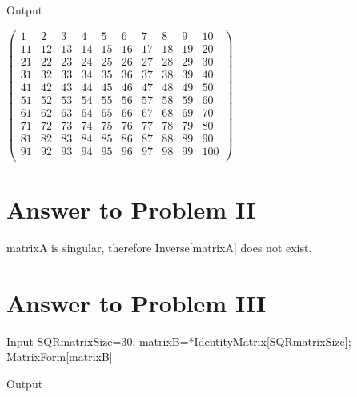 \documentclass[11pt,a4paper]{article}
\begin{document}
\begin{mmaCell}[form=MatrixForm]{Output}

\end{mmaCell}

\begin{doublespace}
\noindent\(\left(
\begin{array}{cccccccccc}
 1 & 2 & 3 & 4 & 5 & 6 & 7 & 8 & 9 & 10 \\
 11 & 12 & 13 & 14 & 15 & 16 & 17 & 18 & 19 & 20 \\
 21 & 22 & 23 & 24 & 25 & 26 & 27 & 28 & 29 & 30 \\
 31 & 32 & 33 & 34 & 35 & 36 & 37 & 38 & 39 & 40 \\
 41 & 42 & 43 & 44 & 45 & 46 & 47 & 48 & 49 & 50 \\
 51 & 52 & 53 & 54 & 55 & 56 & 57 & 58 & 59 & 60 \\
 61 & 62 & 63 & 64 & 65 & 66 & 67 & 68 & 69 & 70 \\
 71 & 72 & 73 & 74 & 75 & 76 & 77 & 78 & 79 & 80 \\
 81 & 82 & 83 & 84 & 85 & 86 & 87 & 88 & 89 & 90 \\
 91 & 92 & 93 & 94 & 95 & 96 & 97 & 98 & 99 & 100 \\
\end{array}
\right)\)
\end{doublespace}

\section{Answer to Problem II}\label{sec:P02}

matrixA is singular, therefore Inverse[matrixA] does not exist.

\clearpage
\section{Answer to Problem III}\label{sec:P03}

\begin{mmaCell}[moredefined={SQRmatrixSize, matrixB}]{Input}
SQRmatrixSize=30;
matrixB=\mmaDef{\(\pmb{\pi}\)}*IdentityMatrix[SQRmatrixSize];
MatrixForm[matrixB]
\end{mmaCell}

\begin{mmaCell}[form=MatrixForm]{Output}

\end{mmaCell}
\end{document}

